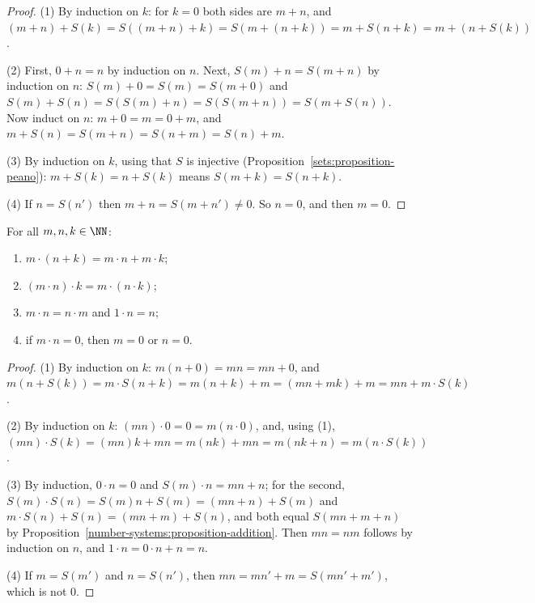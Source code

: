 \begin{proof}
(1) By induction on $k$: for $k = 0$ both sides are $m + n$, and
$(m + n) + S(k) = S((m + n) + k) = S(m + (n + k)) = m + S(n + k) = m + (n + S(k))$.

(2) First, $0 + n = n$ by induction on $n$. Next, $S(m) + n = S(m + n)$ by
induction on $n$: $S(m) + 0 = S(m) = S(m + 0)$ and
$S(m) + S(n) = S(S(m) + n) = S(S(m + n)) = S(m + S(n))$. Now induct on $n$:
$m + 0 = m = 0 + m$, and $m + S(n) = S(m + n) = S(n + m) = S(n) + m$.

(3) By induction on $k$, using that $S$ is injective
(Proposition~\ref{sets:proposition-peano}):
$m + S(k) = n + S(k)$ means $S(m + k) = S(n + k)$.

(4) If $n = S(n')$ then $m + n = S(m + n') \neq 0$. So $n = 0$, and then $m = 0$.
\end{proof}

\begin{proposition}\label{number-systems:proposition-multiplication}
For all $m, n, k \in \NN$:
\begin{enumerate}
\item $m \cdot (n + k) = m \cdot n + m \cdot k$;
\item $(m \cdot n) \cdot k = m \cdot (n \cdot k)$;
\item $m \cdot n = n \cdot m$ and $1 \cdot n = n$;
\item if $m \cdot n = 0$, then $m = 0$ or $n = 0$.
\end{enumerate}
\end{proposition}

\begin{proof}
(1) By induction on $k$: $m(n + 0) = mn = mn + 0$, and
$m(n + S(k)) = m \cdot S(n + k) = m(n + k) + m = (mn + mk) + m = mn + m \cdot S(k)$.

(2) By induction on $k$: $(mn) \cdot 0 = 0 = m(n \cdot 0)$, and, using (1),
$(mn) \cdot S(k) = (mn)k + mn = m(nk) + mn = m(nk + n) = m(n \cdot S(k))$.

(3) By induction, $0 \cdot n = 0$ and $S(m) \cdot n = mn + n$; for the second,
$S(m) \cdot S(n) = S(m) n + S(m) = (mn + n) + S(m)$ and
$m \cdot S(n) + S(n) = (mn + m) + S(n)$, and both equal $S(mn + m + n)$ by
Proposition~\ref{number-systems:proposition-addition}. Then $mn = nm$ follows by
induction on $n$, and $1 \cdot n = 0 \cdot n + n = n$.

(4) If $m = S(m')$ and $n = S(n')$, then $mn = mn' + m = S(mn' + m')$, which is
not $0$.
\end{proof}

